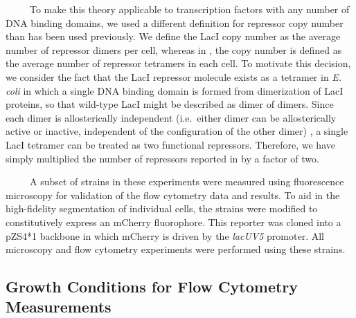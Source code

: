 \documentclass[12pt]{caltech_thesis}
\begin{document}
~~~~~To make this theory applicable to transcription factors with any
number of DNA binding domains, we used a different definition for
repressor copy number than has been used previously. We define the LacI
copy number as the average number of repressor dimers per cell, whereas
in \textcite{garcia2011}, the copy number is defined as the average
number of repressor tetramers in each cell. To motivate this decision,
we consider the fact that the LacI repressor molecule exists as a
tetramer in \emph{E. coli} \autocite{lewis1996} in which a single DNA
binding domain is formed from dimerization of LacI proteins, so that
wild-type LacI might be described as dimer of dimers. Since each dimer
is allosterically independent (i.e.~either dimer can be allosterically
active or inactive, independent of the configuration of the other dimer)
\autocite{daber2009a}, a single LacI tetramer can be treated as two
functional repressors. Therefore, we have simply multiplied the number
of repressors reported in \textcite{garcia2011} by a factor of two.

~~~~~A subset of strains in these experiments were measured using
fluorescence microscopy for validation of the flow cytometry data and
results. To aid in the high-fidelity segmentation of individual cells,
the strains were modified to constitutively express an mCherry
fluorophore. This reporter was cloned into a pZS4*1 backbone
\autocite{lutz1997} in which mCherry is driven by the \emph{lacUV5}
promoter. All microscopy and flow cytometry experiments were performed
using these strains.

\hypertarget{growth-conditions-for-flow-cytometry-measurements}{%
\subsection{Growth Conditions for Flow Cytometry
Measurements}\label{growth-conditions-for-flow-cytometry-measurements}}
\end{document}
